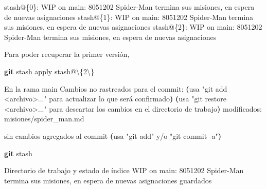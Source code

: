 \documentclass[
]{book}
\newenvironment{Shaded}{\begin{snugshade}}{\end{snugshade}}
\newcommand{\DataTypeTok}[1]{\textcolor[rgb]{0.13,0.29,0.53}{#1}}
\newcommand{\ErrorTok}[1]{\textcolor[rgb]{0.64,0.00,0.00}{\textbf{#1}}}
\newcommand{\ExtensionTok}[1]{#1}
\newcommand{\FunctionTok}[1]{\textcolor[rgb]{0.13,0.29,0.53}{\textbf{#1}}}
\newcommand{\KeywordTok}[1]{\textcolor[rgb]{0.13,0.29,0.53}{\textbf{#1}}}
\newcommand{\NormalTok}[1]{#1}
\newcommand{\StringTok}[1]{\textcolor[rgb]{0.31,0.60,0.02}{#1}}
\begin{document}
\begin{Shaded}
\begin{Highlighting}[]
\ExtensionTok{stash@\{0\}:}\NormalTok{ WIP on main: 8051202 Spider{-}Man termina sus misiones, en espera de nuevas asignaciones}
\ExtensionTok{stash@\{1\}:}\NormalTok{ WIP on main: 8051202 Spider{-}Man termina sus misiones, en espera de nuevas asignaciones}
\ExtensionTok{stash@\{2\}:}\NormalTok{ WIP on main: 8051202 Spider{-}Man termina sus misiones, en espera de nuevas asignaciones}
\end{Highlighting}
\end{Shaded}

Para poder recuperar la primer versión,

\begin{Shaded}
\begin{Highlighting}[]
\FunctionTok{git}\NormalTok{ stash apply stash@}\DataTypeTok{\textbackslash{}\{}\NormalTok{2}\DataTypeTok{\textbackslash{}\}}                                           
\end{Highlighting}
\end{Shaded}

\begin{Shaded}
\begin{Highlighting}[]
\ExtensionTok{En}\NormalTok{ la rama main}
\ExtensionTok{Cambios}\NormalTok{ no rastreados para el commit:}
  \KeywordTok{(}\ExtensionTok{usa} \StringTok{"git add \textless{}archivo\textgreater{}..."}\NormalTok{ para actualizar lo que será confirmado}\KeywordTok{)}
  \KeywordTok{(}\ExtensionTok{usa} \StringTok{"git restore \textless{}archivo\textgreater{}..."}\NormalTok{ para descartar los cambios en el directorio de trabajo}\KeywordTok{)}
    \ExtensionTok{modificados:}\NormalTok{     misiones/spider\_man.md}

\ExtensionTok{sin}\NormalTok{ cambios agregados al commit }\ErrorTok{(}\ExtensionTok{usa} \StringTok{"git add"}\NormalTok{ y/o }\StringTok{"git commit {-}a"}\KeywordTok{)}
\end{Highlighting}
\end{Shaded}

\begin{Shaded}
\begin{Highlighting}[]
\FunctionTok{git}\NormalTok{ stash}
\end{Highlighting}
\end{Shaded}

\begin{Shaded}
\begin{Highlighting}[]
\ExtensionTok{Directorio}\NormalTok{ de trabajo y estado de índice WIP on main: 8051202 Spider{-}Man termina sus misiones, en espera de nuevas asignaciones guardados}
\end{Highlighting}
\end{Shaded}
\end{document}
